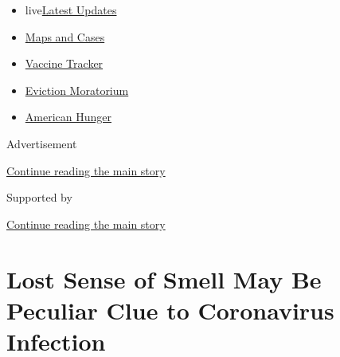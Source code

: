 \begin{itemize}
\tightlist
\item
  live\href{https://www.nytimes3xbfgragh.onion/2020/09/05/world/coronavirus-covid.html?name=styln-coronavirus-national\&region=TOP_BANNER\&block=storyline_menu_recirc\&action=click\&pgtype=Article\&impression_id=52f561b1-efba-11ea-bed1-593c78fad5c8\&variant=undefined}{Latest
  Updates}
\item
  \href{https://www.nytimes3xbfgragh.onion/interactive/2020/us/coronavirus-us-cases.html?name=styln-coronavirus-national\&region=TOP_BANNER\&block=storyline_menu_recirc\&action=click\&pgtype=Article\&impression_id=52f561b2-efba-11ea-bed1-593c78fad5c8\&variant=undefined}{Maps
  and Cases}
\item
  \href{https://www.nytimes3xbfgragh.onion/interactive/2020/science/coronavirus-vaccine-tracker.html?name=styln-coronavirus-national\&region=TOP_BANNER\&block=storyline_menu_recirc\&action=click\&pgtype=Article\&impression_id=52f561b3-efba-11ea-bed1-593c78fad5c8\&variant=undefined}{Vaccine
  Tracker}
\item
  \href{https://www.nytimes3xbfgragh.onion/2020/09/02/your-money/eviction-moratorium-covid.html?name=styln-coronavirus-national\&region=TOP_BANNER\&block=storyline_menu_recirc\&action=click\&pgtype=Article\&impression_id=52f561b4-efba-11ea-bed1-593c78fad5c8\&variant=undefined}{Eviction
  Moratorium}
\item
  \href{https://www.nytimes3xbfgragh.onion/interactive/2020/09/02/magazine/food-insecurity-hunger-us.html?name=styln-coronavirus-national\&region=TOP_BANNER\&block=storyline_menu_recirc\&action=click\&pgtype=Article\&impression_id=52f588c0-efba-11ea-bed1-593c78fad5c8\&variant=undefined}{American
  Hunger}
\end{itemize}

Advertisement

\protect\hyperlink{after-top}{Continue reading the main story}

Supported by

\protect\hyperlink{after-sponsor}{Continue reading the main story}

\hypertarget{lost-sense-of-smell-may-be-peculiar-clue-to-coronavirus-infection}{%
\section{Lost Sense of Smell May Be Peculiar Clue to Coronavirus
Infection}\label{lost-sense-of-smell-may-be-peculiar-clue-to-coronavirus-infection}}

